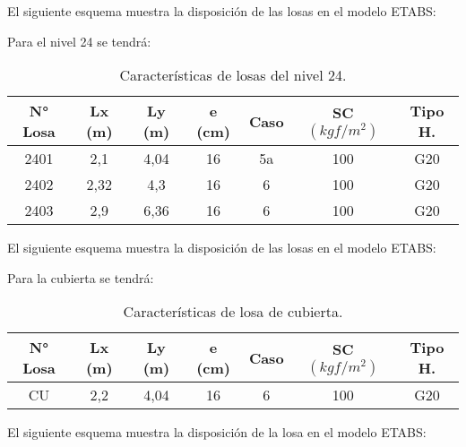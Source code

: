 \newpage

El siguiente esquema muestra la disposición de las losas en el modelo ETABS:


\newpage

Para el nivel 24 se tendrá:

\begin{table}[H]
  \centering
  \caption{Características de losas del nivel 24.}
  \begin{tabular}{ccccccc}
    \hline
    \textbf{N° Losa} &      \textbf{Lx (m)} &      \textbf{Ly (m)} &      \textbf{e (cm)} &      \textbf{Caso} &      \textbf{SC $(kgf/m^2)$} &      \textbf{Tipo H.}      \bigstrut\\
    \hline
    2401 &      2,1 &      4,04 &      16 &      5a &      100 &      G20      \bigstrut[t]\\
    2402 &      2,32 &      4,3 &      16 &      6 &      100 &      G20      \\
    2403 &      2,9 &      6,36 &      16 &      6 &      100 &      G20      \bigstrut[b]\\
    \hline
  \end{tabular}
  \label{losas24}
\end{table}

El siguiente esquema muestra la disposición de las losas en el modelo ETABS:


\newpage
Para la cubierta se tendrá:

\begin{table}[H]
  \centering
  \caption{Características de losa de cubierta.}
  \begin{tabular}{ccccccc}
    \hline
    \textbf{N° Losa} &      \textbf{Lx (m)} &      \textbf{Ly (m)} &      \textbf{e (cm)} &      \textbf{Caso} &      \textbf{SC $(kgf/m^2)$} &      \textbf{Tipo H.}      \bigstrut\\
    \hline
    CU &      2,2 &      4,04 &      16 &      6 &      100 &      G20      \bigstrut\\
    \hline
  \end{tabular}
  \label{losacu}
\end{table}


El siguiente esquema muestra la disposición de la losa en el modelo ETABS:

